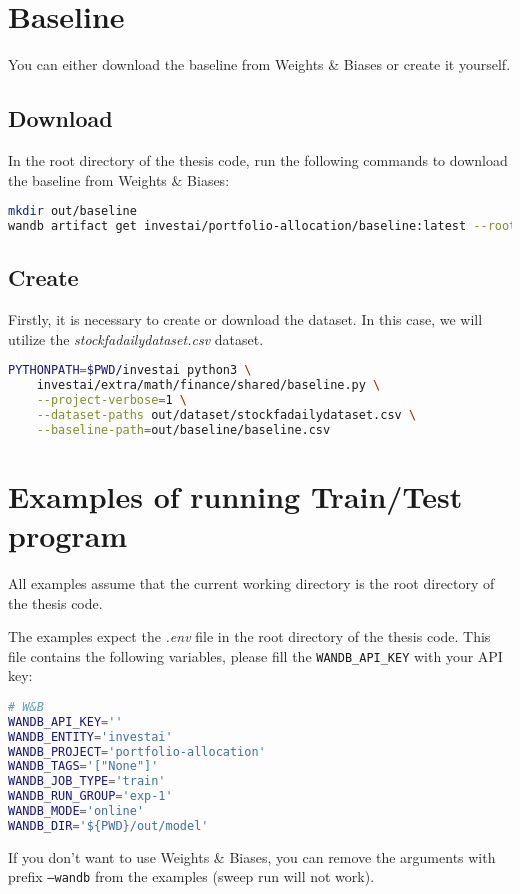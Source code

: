 \documentclass[../xlapes02]{subfiles}
\begin{document}
    \section{Baseline}
    You can either download the baseline from Weights \& Biases or create it yourself.

    \subsection{Download}
    In the root directory of the thesis code, run the following commands to download the baseline from Weights \& Biases:
    \begin{lstlisting}[language=bash]
mkdir out/baseline
wandb artifact get investai/portfolio-allocation/baseline:latest --root out/baseline
    \end{lstlisting}

    \subsection{Create}
    Firstly, it is necessary to create or download the dataset. In this case, we will utilize the \emph{stockfadailydataset.csv} dataset.
    \begin{lstlisting}[language=bash]
PYTHONPATH=$PWD/investai python3 \
    investai/extra/math/finance/shared/baseline.py \
    --project-verbose=1 \
    --dataset-paths out/dataset/stockfadailydataset.csv \
    --baseline-path=out/baseline/baseline.csv
    \end{lstlisting}


    \section{Examples of running Train/Test program}
    All examples assume that the current working directory is the root directory of the thesis code.

    The examples expect the \emph{.env} file in the root directory of the thesis code. This file contains the following variables, please fill the \texttt{WANDB\_API\_KEY} with your API key:
    \begin{lstlisting}[language=bash]
# W&B
WANDB_API_KEY=''
WANDB_ENTITY='investai'
WANDB_PROJECT='portfolio-allocation'
WANDB_TAGS='["None"]'
WANDB_JOB_TYPE='train'
WANDB_RUN_GROUP='exp-1'
WANDB_MODE='online'
WANDB_DIR='${PWD}/out/model'
    \end{lstlisting}
    If you don't want to use Weights \& Biases, you can remove the arguments with prefix \texttt{--wandb} from the examples (sweep run will not work).
\end{document}
